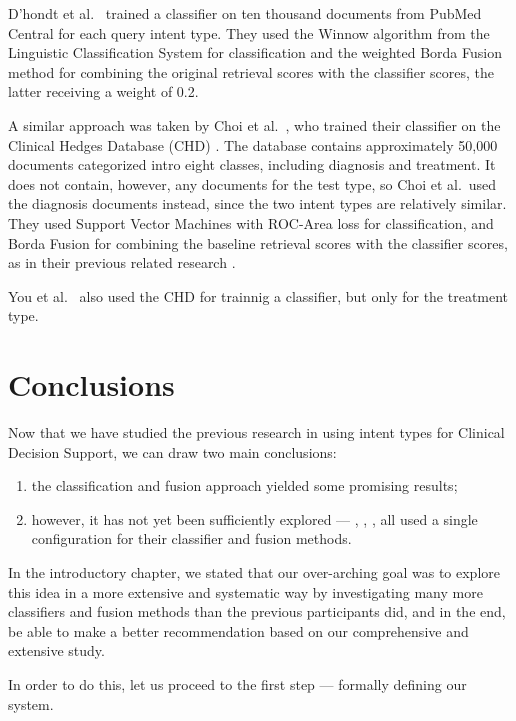 D’hondt et al.\ \cite{limsi2015} trained a classifier on ten thousand documents from PubMed Central
for each query intent type. They used the Winnow algorithm from the Linguistic Classification System
for classification and the weighted Borda Fusion method for combining the original retrieval scores
with the classifier scores, the latter receiving a weight of 0.2. 

A similar approach was taken by Choi et al.\ \cite{choi},
who trained their classifier on the Clinical Hedges Database (CHD) \cite{chd}. 
The database contains approximately 50,000 documents categorized 
intro eight classes, including diagnosis and treatment. 
It does not contain, however, any documents for the test type, so Choi et al.\ used the diagnosis documents instead,
since the two intent types are relatively similar.
They used Support Vector Machines with ROC-Area loss for classification, 
and Borda Fusion for combining the baseline retrieval 
scores with the classifier scores, as in their previous related research \cite{choi-prev}.

You et al.\ \cite{FDUMedSearch} also used the CHD for trainnig a classifier, but only for the treatment type.

\section{Conclusions}
Now that we have studied the previous research in 
using intent types for Clinical Decision Support, we can draw two main conclusions:
\begin{enumerate}
 \item the classification and fusion approach yielded some promising results;
 \item however, it has not yet been sufficiently explored --- \cite{choi}, \cite{FDUMedSearch}, \cite{soldani}, \cite{limsi2015}
 all used a single configuration for their classifier and fusion methods.
\end{enumerate}

In the introductory chapter, we stated that our over-arching goal was to
explore this idea in a more extensive and systematic way by investigating
many more classifiers and fusion methods than the previous participants did, and in the end,
be able to make a better recommendation based on our comprehensive and extensive study. 

In order to do this, let us proceed to the first step --- formally defining our system.


